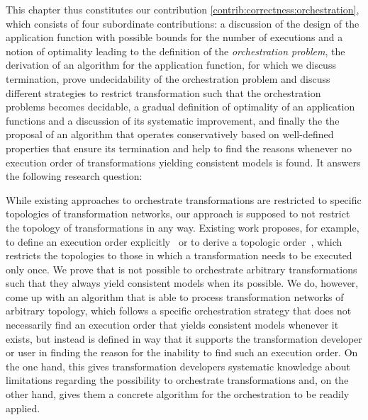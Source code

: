 This chapter thus constitutes our contribution \autoref{contrib:correctness:orchestration}, which consists of four subordinate contributions:
a discussion of the design of the application function with possible bounds for the number of executions and a notion of optimality leading to the definition of the \emph{orchestration problem}, the derivation of an algorithm for the application function, for which we discuss termination, prove undecidability of the orchestration problem and discuss different strategies to restrict transformation such that the orchestration problems becomes decidable, a gradual definition of optimality of an application functions and a discussion of its systematic improvement, and finally the the proposal of an algorithm that operates conservatively based on well-defined properties that ensure its termination and help to find the reasons whenever no execution order of transformations yielding consistent models is found.
It answers the following research question:


While existing approaches to orchestrate transformations are restricted to specific topologies of transformation networks, our approach is supposed to not restrict the topology of transformations in any way.
Existing work proposes, for example, to define an execution order explicitly~\cite{pilgrim2008a, vanhooff2007UniTI-MODELS} or to derive a topologic order~\cite{stevens2020BidirectionalTransformationLarge-SoSym}, which restricts the topologies to those in which a transformation needs to be executed only once.
We prove that is not possible to orchestrate arbitrary transformations such that they always yield consistent models when its possible.
We do, however, come up with an algorithm that is able to process transformation networks of arbitrary topology, which follows a specific orchestration strategy that does not necessarily find an execution order that yields consistent models whenever it exists, but instead is defined in way that it supports the transformation developer or user in finding the reason for the inability to find such an execution order.
On the one hand, this gives transformation developers systematic knowledge about limitations regarding the possibility to orchestrate transformations and, on the other hand, gives them a concrete algorithm for the orchestration to be readily applied.

